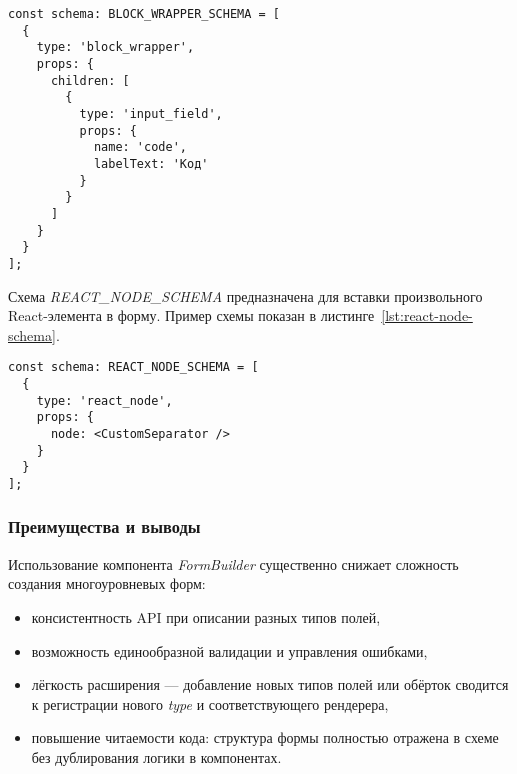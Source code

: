 \begin{lstlisting}[caption={Пример \textit{BLOCK\_WRAPPER\_SCHEMA}},label={lst:block-wrapper-schema}]
const schema: BLOCK_WRAPPER_SCHEMA = [
  {
    type: 'block_wrapper',
    props: {
      children: [
        {
          type: 'input_field',
          props: {
            name: 'code',
            labelText: 'Код'
          }
        }
      ]
    }
  }
];
\end{lstlisting}

Схема \textit{REACT\_NODE\_SCHEMA} предназначена для вставки произвольного React-элемента в форму. Пример схемы показан в листинге~\ref{lst:react-node-schema}.

\begin{lstlisting}[caption={Пример \textit{REACT\_NODE\_SCHEMA}},label={lst:react-node-schema}]
const schema: REACT_NODE_SCHEMA = [
  {
    type: 'react_node',
    props: {
      node: <CustomSeparator />
    }
  }
];
\end{lstlisting}

\subsubsection{Преимущества и выводы}
Использование компонента \textit{FormBuilder} существенно снижает сложность создания многоуровневых форм:
\begin{itemize}
  \item консистентность API при описании разных типов полей,
  \item возможность единообразной валидации и управления ошибками,
  \item лёгкость расширения — добавление новых типов полей или обёрток сводится к регистрации нового \textit{type} и соответствующего рендерера,
  \item повышение читаемости кода: структура формы полностью отражена в схеме без дублирования логики в компонентах.
\end{itemize}

